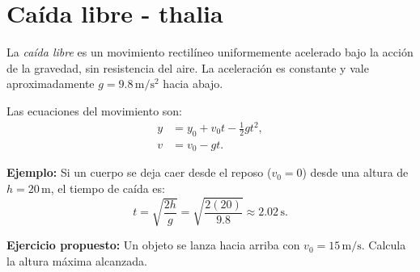 \section{Caída libre - thalia}
La \emph{caída libre} es un movimiento rectilíneo uniformemente acelerado bajo la acción de la gravedad, sin resistencia del aire. La aceleración es constante y vale aproximadamente $g = 9.8\,\mathrm{m/s^2}$ hacia abajo.


Las ecuaciones del movimiento son:
\begin{align}
y &= y_0 + v_0 t - \tfrac{1}{2} g t^2, \\
v &= v_0 - g t.
\end{align}


\textbf{Ejemplo:} Si un cuerpo se deja caer desde el reposo ($v_0 = 0$) desde una altura de $h = 20\,\mathrm{m}$, el tiempo de caída es:
\begin{equation}
t = \sqrt{\frac{2h}{g}} = \sqrt{\frac{2(20)}{9.8}} \approx 2.02\,\mathrm{s}.
\end{equation}


\textbf{Ejercicio propuesto:} Un objeto se lanza hacia arriba con $v_0 = 15\,\mathrm{m/s}$. Calcula la altura máxima alcanzada.